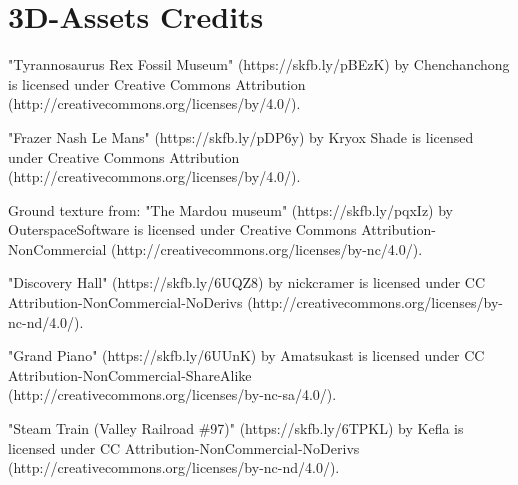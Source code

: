 \section*{3D-Assets Credits}
"Tyrannosaurus Rex Fossil Museum" (https://skfb.ly/pBEzK) by Chenchanchong is licensed under Creative Commons
Attribution (http://creativecommons.org/licenses/by/4.0/).

"Frazer Nash Le Mans" (https://skfb.ly/pDP6y) by Kryox Shade is licensed under Creative Commons Attribution
(http://creativecommons.org/licenses/by/4.0/).

Ground texture from: "The Mardou museum" (https://skfb.ly/pqxIz) by OuterspaceSoftware is licensed under Creative
Commons Attribution-NonCommercial (http://creativecommons.org/licenses/by-nc/4.0/).

"Discovery Hall" (https://skfb.ly/6UQZ8) by nickcramer is licensed under CC Attribution-NonCommercial-NoDerivs
(http://creativecommons.org/licenses/by-nc-nd/4.0/).

"Grand Piano" (https://skfb.ly/6UUnK) by Amatsukast is licensed under CC Attribution-NonCommercial-ShareAlike
(http://creativecommons.org/licenses/by-nc-sa/4.0/).

"Steam Train (Valley Railroad \#97)" (https://skfb.ly/6TPKL) by Kefla is licensed under CC
Attribution-NonCommercial-NoDerivs (http://creativecommons.org/licenses/by-nc-nd/4.0/).